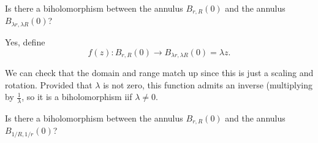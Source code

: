 \documentclass{homework}
\begin{document}
                                                                                                                                                \begin{problem}\label{annulus-scale}
                                                                                                                                                  Is there a biholomorphism between the annulus $B_{r,R}(0)$ and the
                                                                                                                                                    annulus $B_{\lambda r, \lambda R}(0)$?
                                                                                                                                                    \end{problem}
                                                                                                                                                    \begin{solution}
                                                                                                                                                    Yes, define 
                                                                                                                                                    \[
                                                                                                                                                    f(z):B_{r, R}(0) \to B_{\lambda r , \lambda R}(0) = \lambda z.
                                                                                                                                                    \]

                                                                                                                                                    We can check that the domain and range match up since this is just a scaling and rotation. Provided that $\lambda$ is not zero, this function admits an inverse (multiplying by $\frac{1}{\lambda}$, so it is a biholomorphism iif $\lambda\neq 0.$

                                                                                                                                                    \end{solution}
                                                                                                                                                    \begin{problem}\label{annulus-flip}
                                                                                                                                                      Is there a biholomorphism between the annulus $B_{r,R}(0)$ and the
                                                                                                                                                        annulus $B_{1/R,1/r}(0)$?
                                                                                                                                                        \end{problem}
\end{document}

